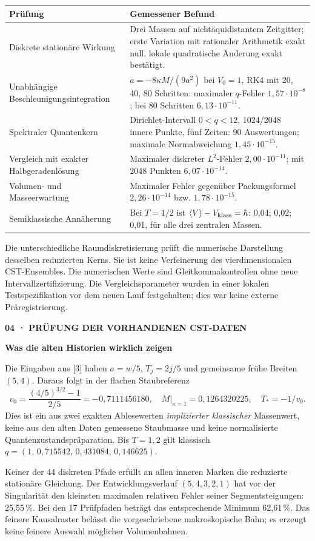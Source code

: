 \documentclass[11pt,a4paper]{article}
\newcommand{\kicker}[1]{{\sffamily\small\bfseries\color{teal}#1}\par}
\newcommand{\tit}[1]{{\sffamily\LARGE\bfseries\color{ink}#1}\par\vspace{6pt}}
\newcommand{\sect}[1]{\par\vspace{6pt}{\sffamily\large\bfseries\color{ink}#1}\par}
\begin{document}
\begin{tabularx}{\linewidth}{@{}p{59mm}Y@{}}\toprule
\textbf{Prüfung} & \textbf{Gemessener Befund}\\\midrule
Diskrete stationäre Wirkung & Drei Massen auf nichtäquidistantem Zeitgitter; erste Variation mit rationaler Arithmetik exakt null, lokale quadratische Änderung exakt bestätigt.\\
Unabhängige Beschleunigungsintegration & $\ddot a=-8\kappa M/(9a^2)$ bei $V_0=1$, RK4 mit 20, 40, 80 Schritten: maximaler $q$-Fehler $1{,}57\cdot10^{-8}$; bei 80 Schritten $6{,}13\cdot10^{-11}$.\\
Spektraler Quantenkern & Dirichlet-Intervall $0<q<12$, 1024/2048 innere Punkte, fünf Zeiten: 90 Auswertungen; maximale Normabweichung $1{,}45\cdot10^{-15}$.\\
Vergleich mit exakter Halbgeradenlösung & Maximaler diskreter $L^2$-Fehler $2{,}00\cdot10^{-11}$; mit 2048 Punkten $6{,}07\cdot10^{-14}$.\\
Volumen- und Masseerwartung & Maximaler Fehler gegenüber Packungsformel $2{,}26\cdot10^{-14}$ bzw. $1{,}78\cdot10^{-15}$.\\
Semiklassische Annäherung & Bei $T=1/2$ ist $\langle V\rangle-V_{\rm klass}=\hbar$: 0,04; 0,02; 0,01, für alle drei zentralen Massen.\\\bottomrule
\end{tabularx}

Die unterschiedliche Raumdiskretisierung prüft die numerische Darstellung desselben reduzierten Kerns. Sie ist keine Verfeinerung des vierdimensionalen CST-Ensembles. Die numerischen Werte sind Gleitkommakontrollen ohne neue Intervallzertifizierung. Die Vergleichsparameter wurden in einer lokalen Testspezifikation vor dem neuen Lauf festgehalten; dies war keine externe Präregistrierung.

\newpage
\kicker{04 · PRÜFUNG DER VORHANDENEN CST-DATEN}
\tit{Was die alten Historien wirklich zeigen}
\sect{A. Die 27 und 17 vorgegebenen Volumenpfade}
Die Eingaben aus [3] haben $a=w/5$, $T_j=2j/5$ und gemeinsame frühe Breiten $(5,4)$. Daraus folgt in der flachen Staubreferenz
\[
 v_0=\frac{(4/5)^{3/2}-1}{2/5}=-0{,}7111456180,\quad
 M\big|_{\kappa=1}=0{,}1264320225,\quad T_*=-1/v_0.
\]
Dies ist ein aus zwei exakten Ablesewerten \emph{implizierter klassischer} Massenwert, keine aus den alten Daten gemessene Staubmasse und keine normalisierte Quantenzustandspräparation. Bis $T=1{,}2$ gilt klassisch $q=(1,\,0{,}715542,\,0{,}431084,\,0{,}146625)$.

Keiner der 44 diskreten Pfade erfüllt an allen inneren Marken die reduzierte stationäre Gleichung. Der Entwicklungsverlauf $(5,4,3,2,1)$ hat vor der Singularität den kleinsten maximalen relativen Fehler seiner Segmentsteigungen: 25,55\,\%. Bei den 17 Prüfpfaden beträgt das entsprechende Minimum 62,61\,\%. Das feinere Kausalraster belässt die vorgeschriebene makroskopische Bahn; es erzeugt keine feinere Auswahl möglicher Volumenbahnen.
\end{document}
